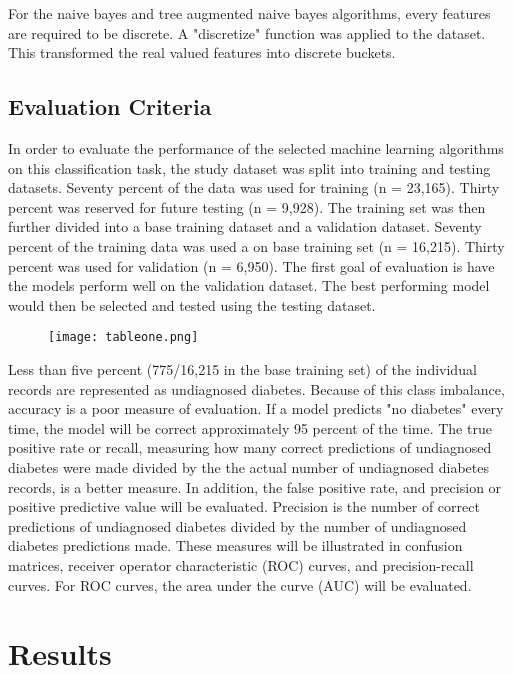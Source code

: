 \documentclass[twoside,11pt]{article}
\begin{document}
For the naive bayes and tree augmented naive bayes algorithms, every features are required to be discrete. A "discretize" function was applied to the dataset. This transformed the real valued features into discrete buckets. 

\subsection{Evaluation Criteria}
In order to evaluate the performance of the selected machine learning algorithms on this classification task, the study dataset was split into training and testing datasets. Seventy percent of the data was used for training (n = 23,165). Thirty percent was reserved for future testing (n = 9,928). The training set was then further divided into a base training dataset and a validation dataset. Seventy percent of the training data was used a on base training set (n = 16,215). Thirty percent was used for validation (n = 6,950). The first goal of evaluation is have the models perform well on the validation dataset. The best performing model would then be selected and tested using the testing dataset. 

\begin{figure}[htbp]
  \centering 
  \texttt{[image: tableone.png]} 
  \label{fig:example} 
\end{figure} 

Less than five percent (775/16,215 in the base training set) of the individual records are represented as undiagnosed diabetes. Because of this class imbalance, accuracy is a poor measure of evaluation. If a model predicts "no diabetes" every time, the model will be correct approximately 95 percent of the time. The true positive rate or recall, measuring how many correct predictions of undiagnosed diabetes were made divided by the the actual number of undiagnosed diabetes records, is a better measure. In addition, the false positive rate, and precision or positive predictive value will be evaluated. Precision is the number of correct predictions of undiagnosed diabetes divided by the number of undiagnosed diabetes predictions made. These measures will be illustrated in confusion matrices, receiver operator characteristic (ROC) curves, and precision-recall curves. For ROC curves, the area under the curve (AUC) will be evaluated. 

\section{Results} \label{results}
\end{document}
